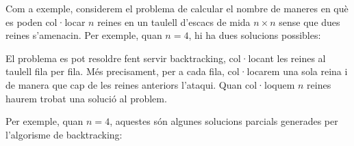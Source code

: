 
Com a exemple, considerem el problema de
calcular el nombre
de maneres en què es poden col·locar $n$ reines
en un taulell d'escacs de mida $n \times n$
sense que dues reines s'amenacin.
Per exemple, quan $n=4$,
hi ha dues solucions possibles:

\begin{center}
\end{center}

El problema es pot resoldre fent servir backtracking,
col·locant les reines al taulell fila per fila.
Més precisament, per a cada fila, col·locarem una sola reina
i de manera que cap de les reines anteriors l'ataqui.
Quan col·loquem $n$ reines haurem trobat una solució
al problem.

Per exemple, quan $n=4$,
aquestes són algunes solucions parcials generades per
l'algorisme de backtracking:

